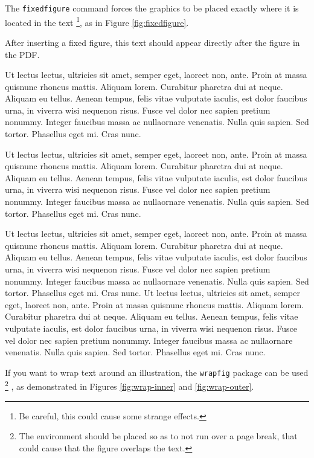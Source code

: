The \texttt{fixedfigure} command forces the graphics to be placed exactly where it is located in the text
\footnote{Be careful, this could cause some strange effects.}, 
as in Figure \ref{fig:fixedfigure}.

\label{fig:fixedfigure}

After inserting a fixed figure, this text should appear directly after the figure in the PDF.

Ut lectus lectus, ultricies sit amet, semper eget, laoreet non, ante. Proin at massa quisnunc rhoncus mattis. Aliquam lorem. Curabitur pharetra dui at neque. Aliquam eu tellus. Aenean tempus, felis vitae vulputate iaculis, est dolor faucibus urna, in viverra wisi nequenon risus. Fusce vel dolor nec sapien pretium nonummy. Integer faucibus massa ac nullaornare venenatis. Nulla quis sapien. Sed tortor. Phasellus eget mi. Cras nunc.

Ut lectus lectus, ultricies sit amet, semper eget, laoreet non, ante. Proin at massa quisnunc rhoncus mattis. Aliquam lorem. Curabitur pharetra dui at neque. Aliquam eu tellus. Aenean tempus, felis vitae vulputate iaculis, est dolor faucibus urna, in viverra wisi nequenon risus. Fusce vel dolor nec sapien pretium nonummy. Integer faucibus massa ac nullaornare venenatis. Nulla quis sapien. Sed tortor. Phasellus eget mi. Cras nunc.

Ut lectus lectus, ultricies sit amet, semper eget, laoreet non, ante. Proin at massa quisnunc rhoncus mattis. Aliquam lorem. Curabitur pharetra dui at neque. Aliquam eu tellus. Aenean tempus, felis vitae vulputate iaculis, est dolor faucibus urna, in viverra wisi nequenon risus. Fusce vel dolor nec sapien pretium nonummy. Integer faucibus massa ac nullaornare venenatis. Nulla quis sapien. Sed tortor. Phasellus eget mi. Cras nunc.
Ut lectus lectus, ultricies sit amet, semper eget, laoreet non, ante. Proin at massa quisnunc rhoncus mattis. Aliquam lorem. Curabitur pharetra dui at neque. Aliquam eu tellus. Aenean tempus, felis vitae vulputate iaculis, est dolor faucibus urna, in viverra wisi nequenon risus. Fusce vel dolor nec sapien pretium nonummy. Integer faucibus massa ac nullaornare venenatis. Nulla quis sapien. Sed tortor. Phasellus eget mi. Cras nunc.

If you want to wrap text around an illustration, the \texttt{wrapfig} package can be used
\footnote{The environment should be placed so as to not run over a page break, that could cause that the figure overlaps the text.}
, as demonstrated in Figures \ref{fig:wrap-inner} and \ref{fig:wrap-outer}.

